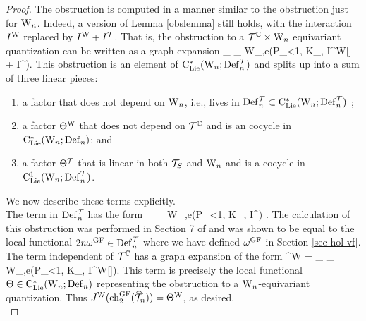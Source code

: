 \begin{proof}
The obstruction is computed in a manner similar to the obstruction just for ${{\rm W}_n}$. Indeed, a version of Lemma \ref{obslemma} still holds, with the interaction $I^{\rm W}$ replaced by $I^{\rm W} + I^\mathcal T$. That is, the obstruction to a $\mathcal T^\mathbb C \times {{\rm W}_n}$ equivariant quantization can be written as a graph expansion
\ben
\lim_{\epsilon {}} \sum_{} W_{\Gamma,e}(P_{\epsilon<1}, K_\epsilon,
I^{\rm W}[\epsilon] + I^\cT[\epsilon]).
\een
This obstruction is an element of ${\rm C}_{{\rm Lie}}^*({{\rm W}_n} ; {\rm Def}_n^\mathcal T)$ and splits up into a sum of three linear pieces: 
\begin{enumerate}
\item a factor that does not depend on ${{\rm W}_n}$, i.e., lives in ${\rm Def}_n^\mathcal T \subset {\rm C}_{{\rm Lie}}^*({{\rm W}_n} ; {\rm Def}_n^\mathcal T)$ ; 
\item a factor $\Theta^{\rm W}$ that does not depend on $\mathcal T^\mathbb C$ and is an cocycle in ${\rm C}_{{\rm Lie}}^*({{\rm W}_n} ; {\rm Def}_n)$; and 
\item a factor $\Theta^{\mathcal T}$ that is linear in both $\mathcal T_S$ and ${{\rm W}_n}$ and is a cocycle in ${\rm C}_{{\rm Lie}}^1({{\rm W}_n} ; {\rm Def}_n^\mathcal T)$.
\end{enumerate}
We now describe these terms explicitly.\\

The term in ${\rm Def}_n^\mathcal T$ has the form
\ben
\lim_{\epsilon {}} \sum_{} W_{\Gamma,e}(P_{\epsilon<1}, K_\epsilon, I^\cT[\epsilon]) .
\een
The calculation of this obstruction was performed in Section 7 of \cite{bw_vir} and was shown to be equal to the local functional $2n \omega^{\rm GF} \in {\rm Def}_n^\mathcal T$ where we have defined $\omega^{{\rm GF}}$ in Section \ref{sec hol vf}.\\ 

The term independent of $\mathcal T^\mathbb C$ has a graph expansion of the form
\ben
\Theta^{\rm W} = \lim_{\epsilon {}} \sum_{} W_{\Gamma,e}(P_{\epsilon<1}, K_\epsilon,
I^{\rm W}[\epsilon]).
\een
This term is precisely the local functional $\Theta \in {\rm C}_{{\rm Lie}}^*({{\rm W}_n} ; {\rm Def}_n)$ representing the obstruction to a ${{\rm W}_n}$-equivariant quantization. Thus $J^{\rm W} ({\rm ch}^{\rm GF}_2(\widehat{\mathcal T}_n)) = \Theta^{\rm W}$, as desired.\\ 


\end{proof}
